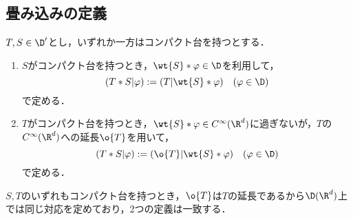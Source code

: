 \documentclass[uplatex,dvipdfmx]{jsreport}
\begin{document}
\subsection{畳み込みの定義}

\begin{definition}
    $T,S\in\D'$とし，いずれか一方はコンパクト台を持つとする．
    \begin{enumerate}
        \item $S$がコンパクト台を持つとき，$\wt{S}*\varphi\in\D$を利用して，
        \[(T*S|\varphi):=(T|\wt{S}*\varphi)\quad(\varphi\in\D)\]
        で定める．
        \item $T$がコンパクト台を持つとき，$\wt{S}*\varphi\in C^\infty(\R^d)$に過ぎないが，$T$の$C^\infty(\R^d)$への延長$\o{T}$を用いて，
        \[(T*S|\varphi):=(\o{T}|\wt{S}*\varphi)\quad(\varphi\in\D)\]
        で定める．
    \end{enumerate}
\end{definition}
\begin{remark}
    $S,T$のいずれもコンパクト台を持つとき，$\o{T}$は$T$の延長であるから$\D(\R^d)$上では同じ対応を定めており，2つの定義は一致する．
\end{remark}
\end{document}
